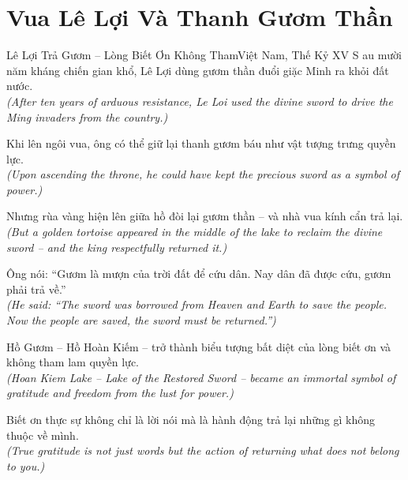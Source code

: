 \section{Vua Lê Lợi Và Thanh Gươm Thần}
\begin{truyen}{Lê Lợi Trả Gươm -- Lòng Biết Ơn Không Tham}{Việt Nam, Thế Kỷ XV}
S au mười năm kháng chiến gian khổ, Lê Lợi dùng gươm thần đuổi giặc Minh ra khỏi đất nước.\\
\textit{(After ten years of arduous resistance, Le Loi used the divine sword to drive the Ming invaders from the country.)}

Khi lên ngôi vua, ông có thể giữ lại thanh gươm báu như vật tượng trưng quyền lực.\\
\textit{(Upon ascending the throne, he could have kept the precious sword as a symbol of power.)}

Nhưng rùa vàng hiện lên giữa hồ đòi lại gươm thần -- và nhà vua kính cẩn trả lại.\\
\textit{(But a golden tortoise appeared in the middle of the lake to reclaim the divine sword -- and the king respectfully returned it.)}

Ông nói: ``Gươm là mượn của trời đất để cứu dân. Nay dân đã được cứu, gươm phải trả về.''\\
\textit{(He said: ``The sword was borrowed from Heaven and Earth to save the people. Now the people are saved, the sword must be returned.'')}

Hồ Gươm -- Hồ Hoàn Kiếm -- trở thành biểu tượng bất diệt của lòng biết ơn và không tham lam quyền lực.\\
\textit{(Hoan Kiem Lake -- Lake of the Restored Sword -- became an immortal symbol of gratitude and freedom from the lust for power.)}

\end{truyen}
\begin{baihoc}
  Biết ơn thực sự không chỉ là lời nói mà là hành động trả lại những gì không thuộc về mình.\\
  \textit{(True gratitude is not just words but the action of returning what does not belong to you.)}
\end{baihoc}

